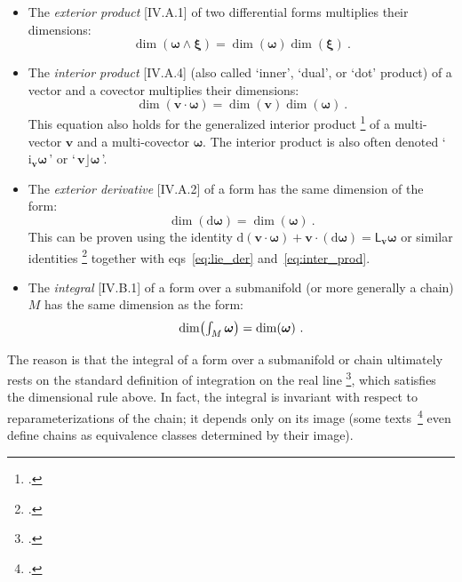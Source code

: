\documentclass[\ifafour a4paper,12pt,\else a5paper,10pt,\fi%
onecolumn,oneside,article,%
british%
]{memoir}
\newcommand*{\defquote}[1]{`#1'}
\newcommand*{\mathquote}[1]{`\,#1\,'}
\theoremstyle{remark}
\theoremstyle{innote}
\newcommand*{\citep}{\footcites}
\newcommand*{\di}{\mathrm{d}}%
\renewcommand*{\|}[1][]{\nonscript\,#1\vert\nonscript\;\mathopen{}}
\newcommand*{\sect}{\S}%
\newcommand*{\sects}{\S\S}%
\newcommand*{\chap}{ch.}%
\newcommand*{\eqns}{eqs}%
\newcommand*{\eg}{{e.g.}}
\newcommand*{\tint}{\begingroup\textstyle\int\endgroup\nolimits}
\newcommand*{\Li}{\textsf{L}}
\newcommand*{\ii}{\cdot}
\newcommand*{\yom}{\bm{\omega}}
\newcommand*{\yta}{\bm{\xi}}
\newcommand*{\yv}{\bm{v}}
\begin{document}
\begin{itemize}[wide=0pt]
\item The \emph{exterior product} [IV.A.1] of two differential forms
  multiplies their dimensions:
  \begin{equation}
  \dim(\yom\land\yta) = \dim(\yom)\dim(\yta) \ .\label{eq:ext_prod}
\end{equation}
  
\item The \emph{interior product} [IV.A.4] (also called \defquote{inner},
  \defquote{dual}, or \defquote{dot} product) of a vector and a covector
  multiplies their dimensions:
  \begin{equation}
    \dim(\yv\ii\yom) =\dim(\yv)\dim(\yom) \ .
    \label{eq:inter_prod}
\end{equation}
This equation also holds for the generalized interior product
\citep{deschamps1970}[Appendices]{deschamps1981}{lindell2004}[\sect~F.I.267]{truesdelletal1960}[Box
4.1, item 4]{misneretal1970_r1973}[see also][]{portamana2019e} of a
multi-vector $\yv$ and a multi-covector $\yom$. The interior product is
also often denoted \mathquote{$\mathrm{i}_{\yv}\yom$} or
\mathquote{$\yv\mathbin{\!\rfloor\!}\yom$}.


\item The \emph{exterior derivative} [IV.A.2] of a form has the same
  dimension of the form:
  \begin{equation}
    \dim(\di\yom) =\dim(\yom) \ .
    \label{eq:ext_deriv}
  \end{equation}
  This can be proven using the identity
  $\di(\yv\ii\yom)+\yv\ii(\di\yom) = \Li_{\yv}\yom$ or similar identities
  \citep[\chap~9 p.~180 Theorem~9.78]{curtisetal1985}[\sect~6.4
  Theorem~6.4.8]{abrahametal1983_r1988} together with
  \eqns~\eqref{eq:lie_der} and~\eqref{eq:inter_prod}.

\item The \emph{integral} [IV.B.1] of a form over a submanifold (or more
  generally a chain) $M$ has the same dimension as the form:
  \begin{equation}
    \dim\bigl(\tint_{M}\yom\bigr) =\dim(\yom) \ .
    \label{eq:integration}
  \end{equation}
\end{itemize}
The reason is that the integral of a form over a submanifold or chain
ultimately rests on the standard definition of integration on the real line
\citep[\eg][\sects~IV.B.1--2]{choquetbruhatetal1977_r1996}[\sect~5 p.~21,
\sect~6
p.~24]{derham1955_t1984}[\sect~7.1]{abrahametal1983_r1988}[\sect~VI.2]{boothby1975_r2003},
which satisfies the dimensional rule above. In fact, the integral is
invariant with respect to reparameterizations of the chain; it depends only
on its image (some texts~\citep[\eg][\sect~10.4]{martin1991_r2004}[\sect~7.3]{fecko2006} even define chains as
equivalence classes determined by their image).
\end{document}
